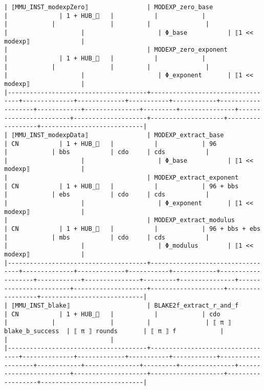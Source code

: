 \documentclass[varwidth=\maxdimen,margin=0.5cm,multi={verbatim}]{standalone}
\begin{document}
\begin{verbatim}
| ⟦MMU_INST_modexpZero⟧                | MODEXP_zero_base                 |              | 1 + HUB_   |           |            |                   |            |               |         |               |                        |                    |                    | Φ_base           | ⟦1 << modexp⟧              |
|                                      | MODEXP_zero_exponent             |              | 1 + HUB_   |           |            |                   |            |               |         |               |                        |                    |                    | Φ_exponent       | ⟦1 << modexp⟧              |
|--------------------------------------+----------------------------------+--------------+-------------+-----------+------------+-------------------+------------+---------------+---------+---------------+------------------------+--------------------+--------------------+------------------+----------------------------|
| ⟦MMU_INST_modexpData⟧                | MODEXP_extract_base              | CN           | 1 + HUB_   |           |            | 96                |            | bbs           | cdo     | cds           |                        |                    |                    | Φ_base           | ⟦1 << modexp⟧              |
|                                      | MODEXP_extract_exponent          | CN           | 1 + HUB_   |           |            | 96 + bbs          |            | ebs           | cdo     | cds           |                        |                    |                    | Φ_exponent       | ⟦1 << modexp⟧              |
|                                      | MODEXP_extract_modulus           | CN           | 1 + HUB_   |           |            | 96 + bbs + ebs    |            | mbs           | cdo     | cds           |                        |                    |                    | Φ_modulus        | ⟦1 << modexp⟧              |
|--------------------------------------+----------------------------------+--------------+-------------+-----------+------------+-------------------+------------+---------------+---------+---------------+------------------------+--------------------+--------------------+------------------+----------------------------|
| ⟦MMU_INST_blake⟧                     | BLAKE2f_extract_r_and_f          | CN           | 1 + HUB_   |           |            | cdo               |            |               |         |               | ⟦ π ⟧ blake_b_success  | ⟦ π ⟧ rounds       | ⟦ π ⟧ f            |                  |                            |
|--------------------------------------+----------------------------------+--------------+-------------+-----------+------------+-------------------+------------+---------------+---------+---------------+------------------------+--------------------+--------------------+------------------+----------------------------|


\end{verbatim}
\end{document}
